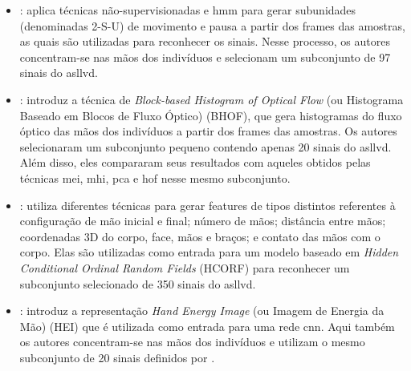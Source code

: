 \begin{itemize}    

    \item {}: aplica técnicas não-supervisionadas e \acrfull{hmm} para gerar subunidades (denominadas 2-S-U) de movimento e pausa a partir dos frames das amostras, as quais são utilizadas para reconhecer os sinais.
    Nesse processo, os autores concentram-se nas mãos dos indivíduos e selecionam um subconjunto de 97 sinais do \acrshort{asllvd}.

    \item {}: introduz a técnica de \textit{Block-based Histogram of Optical Flow} (ou Histograma Baseado em Blocos de Fluxo Óptico) (BHOF), que gera histogramas do fluxo óptico das mãos dos indivíduos a partir dos frames das amostras.
    Os autores selecionaram um subconjunto pequeno contendo apenas 20 sinais do \acrshort{asllvd}. 
    Além disso, eles compararam seus resultados com aqueles obtidos pelas técnicas \acrfull{mei}, \acrfull{mhi}, \acrfull{pca} e \acrfull{hof} nesse mesmo subconjunto.

    \item {}: utiliza diferentes técnicas para gerar features de tipos distintos referentes à configuração de mão inicial e final; número de mãos; distância entre mãos; coordenadas 3D do corpo, face, mãos e braços; e contato das mãos com o corpo. Elas são utilizadas como entrada para um modelo baseado em \textit{Hidden Conditional Ordinal Random Fields} (HCORF) para reconhecer um subconjunto selecionado de 350 sinais do \acrshort{asllvd}.

    \item {}: introduz a representação \textit{Hand Energy Image} (ou Imagem de Energia da Mão) (HEI) que é utilizada como entrada para uma rede \acrfull{cnn}.
    Aqui também os autores concentram-se nas mãos dos indivíduos e utilizam o mesmo subconjunto de 20 sinais definidos por .


\end{itemize}
